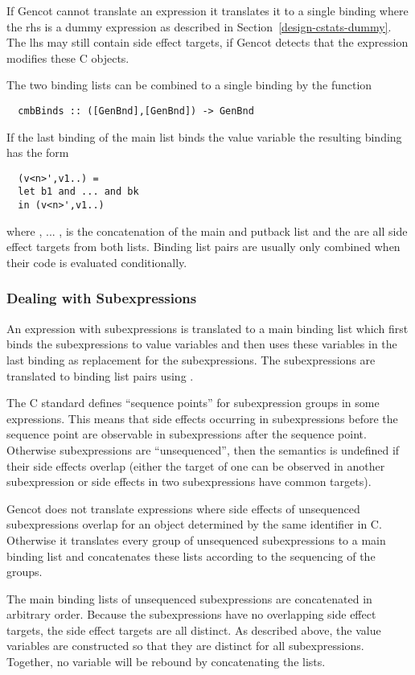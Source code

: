 If Gencot cannot translate an expression it translates it to a single binding where the rhs is a dummy expression as described in 
Section~\ref{design-cstats-dummy}. The lhs may still contain side effect targets, if Gencot detects that the expression
modifies these C objects.

The two binding lists can be combined to a single binding by the function
\begin{verbatim}
  cmbBinds :: ([GenBnd],[GenBnd]) -> GenBnd
\end{verbatim}
If the last binding of the main list binds the value variable  the resulting binding has the form
\begin{verbatim}
  (v<n>',v1..) = 
  let b1 and ... and bk
  in (v<n>',v1..)
\end{verbatim}
where , ... ,  is the concatenation of the main and putback list and the  are all side
effect targets from both lists. Binding list pairs are usually only combined when their code is evaluated conditionally.

\subsubsection{Dealing with Subexpressions}

An expression with subexpressions is translated to a main binding list which first binds the subexpressions to value
variables and then uses these variables in the last binding as replacement for the subexpressions. The subexpressions 
are translated to binding list pairs using .

The C standard defines ``sequence points'' for subexpression groups in some expressions. This means that side effects 
occurring in subexpressions before the sequence point are observable in subexpressions after the sequence point. Otherwise
subexpressions are ``unsequenced'', then the semantics is undefined if their side effects overlap (either the target of 
one can be observed in another subexpression or side effects in two subexpressions have common targets). 

Gencot does not translate expressions where side effects of unsequenced subexpressions overlap for an object determined 
by the same identifier in C. Otherwise it translates every group of unsequenced subexpressions to a main binding list 
and concatenates these lists according to the sequencing of the groups.

The main binding lists of unsequenced subexpressions are concatenated in arbitrary order. Because the subexpressions have no 
overlapping side effect targets, the side effect targets are all distinct. As described above, the value variables are 
constructed so that they are distinct for all subexpressions. Together, no variable will be rebound by concatenating the lists. 

